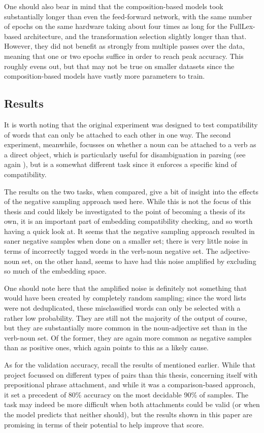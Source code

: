 \documentclass[a4paper, 12pt]{article}
\begin{document}
One should also bear in mind that the composition-based models took substantially longer than even the feed-forward network, with the same number of epochs on the same hardware taking about four times as long for the FullLex-based architecture, and the transformation selection slightly longer than that. However, they did not benefit as strongly from multiple passes over the data, meaning that one or two epochs suffice in order to reach peak accuracy. This roughly evens out, but that may not be true on smaller datasets since the composition-based models have vastly more parameters to train.

\subsection{Results}
It is worth noting that the original experiment was designed to test compatibility of words that can only be attached to each other in one way. The second experiment, meanwhile, focusses on whether a noun can be attached to a verb as a direct object, which is particularly useful for disambiguation in parsing (see again \cite{vanNoord}), but is a somewhat different task since it enforces a specific kind of compatibility.

The results on the two tasks, when compared, give a bit of insight into the effects of the negative sampling approach used here. While this is not the focus of this thesis and could likely be investigated to the point of becoming a thesis of its own, it is an important part of embedding compatibility checking, and so worth having a quick look at. It seems that the negative sampling approach resulted in saner negative samples when done on a smaller set; there is very little noise in terms of incorrectly tagged words in the verb-noun negative set. The adjective-noun set, on the other hand, seems to have had this noise amplified by excluding so much of the embedding space.

One should note here that the amplified noise is definitely not something that would have been created by completely random sampling; since the word lists were not deduplicated, these misclassified words can only be selected with a rather low probability. They are still not the majority of the output of course, but they are substantially more common in the noun-adjective set than in the verb-noun set. Of the former, they are again more common as negative samples than as positive ones, which again points to this as a likely cause.

As for the validation accuracy, recall the results of \cite{Volk} mentioned earlier. While that project focussed on different types of pairs than this thesis, concerning itself with prepositional phrase attachment, and while it was a comparison-based approach, it set a precedent of 80\% accuracy on the most decidable 90\% of samples. The task may indeed be more difficult when both attachments could be valid (or when the model predicts that neither should), but the results shown in this paper are promising in terms of their potential to help improve that score.
\end{document}
